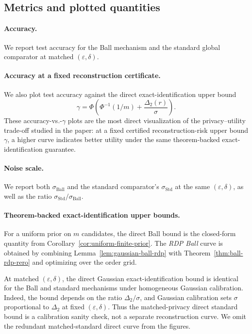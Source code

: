\documentclass[conference,compsoc]{IEEEtran}
\begin{document}
\subsection{Metrics and plotted quantities}
\paragraph{Accuracy.}
We report test accuracy for the Ball mechanism and the standard global comparator at matched $(\varepsilon,\delta)$.

\paragraph{Accuracy at a fixed reconstruction certificate.}
We also plot test accuracy against the direct exact-identification upper bound
\[
\gamma
=
\Phi\!\left(
\Phi^{-1}(1/m)+\frac{\Delta_2(r)}{\sigma}
\right).
\]
These accuracy-vs.-$\gamma$ plots are the most direct visualization of the privacy--utility trade-off studied in the paper: at a fixed certified reconstruction-risk upper bound $\gamma$, a higher curve indicates better utility under the same theorem-backed exact-identification guarantee.

\paragraph{Noise scale.}
We report both $\sigma_{\mathrm{Ball}}$ and the standard comparator's $\sigma_{\mathrm{Std}}$ at the same $(\varepsilon,\delta)$, as well as the ratio $\sigma_{\mathrm{Std}}/\sigma_{\mathrm{Ball}}$.

\paragraph{Theorem-backed exact-identification upper bounds.}
For a uniform prior on $m$ candidates, the direct Ball bound is the closed-form quantity from Corollary~\ref{cor:uniform-finite-prior}. The \emph{RDP Ball} curve is obtained by combining Lemma~\ref{lem:gaussian-ball-rdp} with Theorem~\ref{thm:ball-rdp-rero} and optimizing over the order grid.

At matched $(\varepsilon,\delta)$, the direct Gaussian exact-identification bound is identical for the Ball and standard mechanisms under homogeneous Gaussian calibration. Indeed, the bound depends on the ratio $\Delta_2/\sigma$, and Gaussian calibration sets $\sigma$ proportional to $\Delta_2$ at fixed $(\varepsilon,\delta)$. Thus the matched-privacy direct standard bound is a calibration sanity check, not a separate reconstruction curve. We omit the redundant matched-standard direct curve from the figures.
\end{document}
